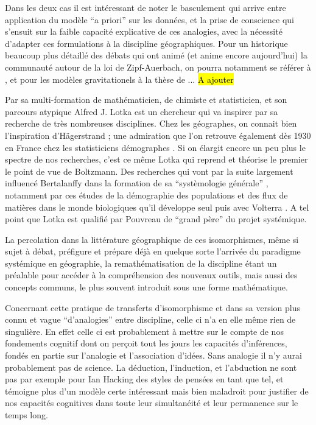 Dans les deux cas il est intéressant de noter le basculement qui arrive entre application du modèle \foreignquote{latin}{a priori} sur les données, et la prise de conscience qui s'ensuit sur la faible capacité explicative de ces analogies, avec la nécessité d'adapter ces formulations à la discipline géographiques. Pour un historique beaucoup plus détaillé des débats qui ont animé (et anime encore aujourd'hui) la communauté autour de la loi de Zipf-Auerbach, on pourra notamment se référer à \textcite{Pumain1982}, et pour les modèles gravitationels à la thèse de ... \hl{A ajouter}


Par sa multi-formation de mathématicien, de chimiste et statisticien, et son parcours atypique Alfred J. Lotka est un chercheur qui va inspirer par sa recherche de très nombreuses disciplines. Chez les géographes, on connait bien l'inspiration d'Hägerstrand \autocite[95]{Claval2007} ; une admiration que l'on retrouve également dès 1930 en France chez les statisticiens démographes \autocite{Veron2009}. Si on élargit encore un peu plus le spectre de nos recherches, c'est ce même Lotka qui reprend et théorise le premier le point de vue de Boltzmann. Des recherches qui vont par la suite largement influencé Bertalanffy dans la formation de sa \enquote{systèmologie générale} \autocite[178]{Pouvreau2013}, notamment par ces études de la démographie des populations et des flux de matières dans le monde biologiques qu'il développe seul puis  avec Volterra \autocite[545-546]{Pouvreau2013}. A tel point que Lotka est qualifié par Pouvreau de \enquote{grand père} du projet systémique.

La percolation dans la littérature géographique de ces isomorphismes, même si sujet à débat, préfigure et prépare déjà en quelque sorte l'arrivée du paradigme systémique en géographie, la remathématisation de la discipline étant un préalable pour accéder à la compréhension des nouveaux outils, mais aussi des concepts communs, le plus souvent introduit sous une forme mathématique.

Concernant cette pratique de transferts d'isomorphisme et dans sa version plus connu et vague \enquote{d'analogies} entre discipline, celle ci n'a en elle même rien de singulière. En effet celle ci est probablement à mettre sur le compte de nos fondements cognitif dont on perçoit tout les jours les capacités d'inférences, fondés en partie sur l’analogie et l'association d'idées. Sans analogie il n'y aurai probablement pas de science. La déduction, l'induction, et l'abduction ne sont pas par exemple pour Ian Hacking des styles de pensées en tant que tel, et témoigne plus d'un modèle certe intéressant mais bien maladroit pour justifier de nos capacités cognitives dans toute leur simultanéité et leur permanence sur le temps long.

